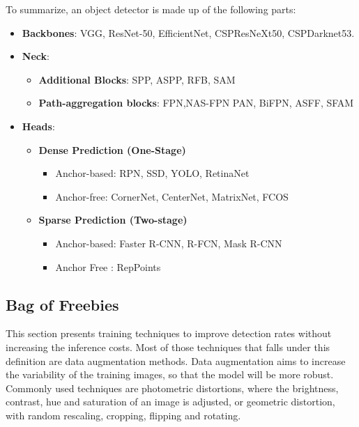 To summarize, an object detector is made up of the following parts:

\begin{itemize}
	\item \textbf{Backbones}: VGG\cite{vgg}, ResNet-50\cite{resNet}, EfficientNet\cite{efficientNet}, CSPResNeXt50\cite{resNeXt}, CSPDarknet53\cite{CSPDarknet53}.
	\item \textbf{Neck}:
		\begin{itemize}
			\item \textbf{Additional Blocks}: SPP\cite{spp}, ASPP\cite{aspp}, RFB\cite{RFB}, SAM\cite{sam}
			\item \textbf{Path-aggregation blocks}: FPN\cite{fpn},NAS-FPN\cite{nasFPN} PAN\cite{pan}, BiFPN\cite{bifpn}, ASFF\cite{ASFF}, SFAM\cite{SFAM} 
		\end{itemize}
	\item \textbf{Heads}:
		\begin{itemize}
			\item \textbf{Dense Prediction (One-Stage)}
				\begin{itemize}
					\item Anchor-based: RPN\cite{FasterRCNN}, SSD\cite{ssd}, YOLO\cite{yolov3}, RetinaNet\cite{retinaNet}
					\item Anchor-free: CornerNet\cite{cornerNet}, CenterNet\cite{centerNet}, MatrixNet\cite{matrixNet}, FCOS\cite{fcos}
				\end{itemize}
			\item \textbf{Sparse Prediction (Two-stage)}
				\begin{itemize}
					\item Anchor-based: Faster R-CNN\cite{FasterRCNN}, R-FCN\cite{rfcn}, Mask R-CNN\cite{maskrcnn}
					\item Anchor Free : RepPoints\cite{repPoints}
				\end{itemize}
		\end{itemize}

\end{itemize}

\subsection{Bag of Freebies}\label{bof}
This section presents training techniques to improve detection rates without increasing the inference costs. Most of those techniques that falls under this definition are data augmentation methods. Data augmentation aims to increase the variability of the training images, so that the model will be more robust. Commonly used techniques are photometric distortions, where the brightness, contrast, hue and saturation of an image is adjusted, or geometric distortion, with random rescaling, cropping, flipping and rotating.

